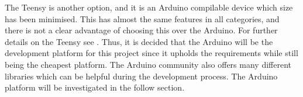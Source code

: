 The Teensy is another option, and it is an Arduino compilable device which size has been minimised.
This has almost the same features in all categories, and there is not a clear advantage of choosing this over the Arduino.
For further details on the Teensy see \cite{TeensyIsDopeMan}.  
Thus, it is decided that the Arduino will be the development platform for this project since it upholds the requirements while still being the cheapest platform.
The Arduino community also offers many different libraries which can be helpful during the development process.
The Arduino platform will be investigated in the follow section.
